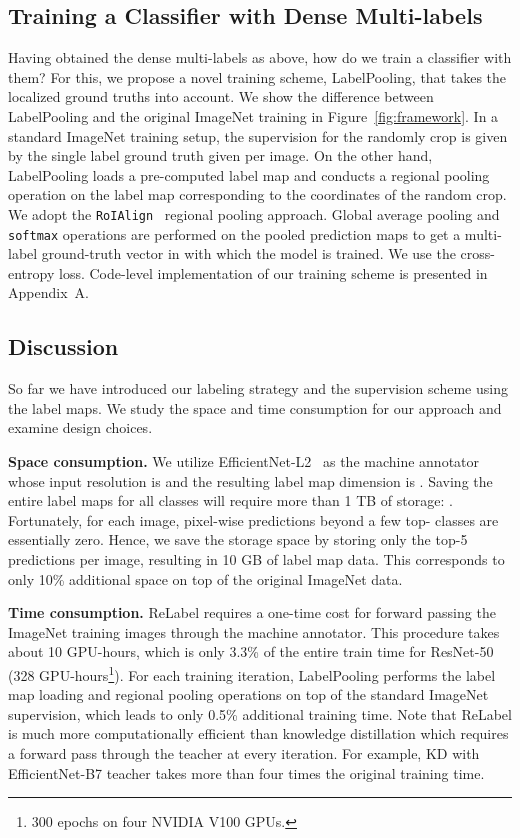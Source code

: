\documentclass[final]{cvpr}
\newcommand\ours{{{\mbox{ReLabel}}}\xspace}
\newcommand\ourframework{{{LabelPooling}}\xspace}
\begin{document}
\subsection{Training a Classifier with Dense Multi-labels}
Having obtained the dense multi-labels  as above, how do we train a classifier with them? 
For this, we propose a novel training scheme, \ourframework, that takes the localized ground truths into account. 
We show the difference between \ourframework and the original ImageNet training in Figure~\ref{fig:framework}.
In a standard ImageNet training setup, the supervision for the randomly crop is given by the single label ground truth given per image. 
On the other hand, \ourframework loads a pre-computed label map and conducts a regional pooling operation on the label map corresponding to the coordinates of the random crop.
We adopt the \texttt{RoIAlign}~\cite{he2017mask} regional pooling approach.
Global average pooling and \texttt{softmax} operations are performed on the pooled prediction maps to get a multi-label ground-truth vector in  with which the model is trained. We use the cross-entropy loss. 
Code-level implementation of our training scheme is presented in Appendix~A.
 \subsection{Discussion}
\label{subsec:discussion}

So far we have introduced our labeling strategy and the supervision scheme using the label maps. We study the space and time consumption for our approach and examine design choices.



\noindent\textbf{Space consumption.}
We utilize EfficientNet-L2~\cite{xie2020noisy_student} as the machine annotator whose input resolution is  and the resulting label map dimension is . 
Saving the entire label maps for all classes will require more than 1 TB of storage: .
Fortunately, for each image, pixel-wise predictions beyond a few top- classes are essentially zero. Hence, we save the storage space by storing only the top-5 predictions per image, resulting in {10} GB of label map data. This corresponds to only 10\% additional space on top of the original ImageNet data.

\noindent\textbf{Time consumption.}
\ours requires a one-time cost for forward passing the ImageNet training images through the machine annotator. This procedure takes about 10 GPU-hours, which is only {3.3\%} of the entire train time for ResNet-50 (328 GPU-hours\footnote{300 epochs on four NVIDIA V100 GPUs.}). 
For each training iteration, \ourframework performs the label map loading and regional pooling operations on top of the standard ImageNet supervision, which leads to only {0.5\%} additional training time. 
Note that \ours is much more computationally efficient than knowledge distillation which requires a forward pass through the teacher at every iteration. For example, KD with EfficientNet-B7 teacher takes more than four times the original training time.
\end{document}
